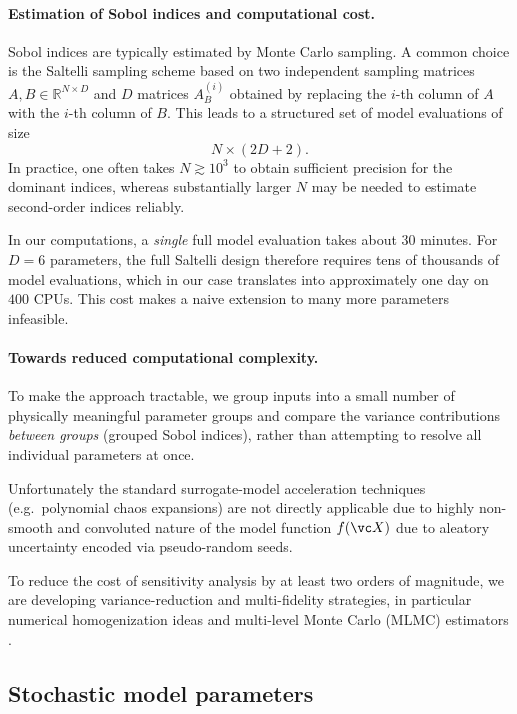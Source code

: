 \paragraph{Estimation of Sobol indices and computational cost.}
Sobol indices are typically estimated by Monte Carlo sampling. A common choice is the Saltelli sampling scheme \cite{Saltelli_Variance_2010} based on two
independent sampling matrices $A,B\in\mathbb{R}^{N\times D}$ and $D$  matrices $A_B^{(i)}$ obtained by replacing the
$i$-th column of $A$ with the $i$-th column of $B$. This leads to a structured set of model evaluations of size
\begin{equation}
N \times (2D+2).
\end{equation}
In practice, one often takes $N\gtrsim 10^3$ to obtain sufficient precision for the dominant indices, whereas
substantially larger $N$ may be needed to estimate second-order indices reliably.

In our computations, a \emph{single} full model evaluation takes about $30$ minutes. For $D=6$ parameters, the full Saltelli
design therefore requires tens of thousands of model evaluations, which in our case translates into approximately one day on
$400$ CPUs. This cost makes a naive extension to many more parameters infeasible.



\paragraph{Towards reduced computational complexity.}
To make the approach tractable, we group inputs into a small number of physically meaningful parameter groups and compare the variance
contributions \emph{between groups} (grouped Sobol indices), rather than attempting to resolve all individual parameters at once.

Unfortunately the standard surrogate-model acceleration techniques (e.g.\ polynomial chaos expansions) are not directly applicable 
due to highly non-smooth and convoluted nature of the model function $f(\vc X)$ due to aleatory uncertainty encoded via pseudo-random seeds.

To reduce the cost of sensitivity analysis by at least two orders of magnitude, we are developing variance-reduction and
multi-fidelity strategies, in particular numerical homogenization ideas \cite{Spetlik_Convolutional_2026} and multi-level Monte Carlo (MLMC) estimators \cite{Giles2015}.

\subsection{Stochastic model parameters}

